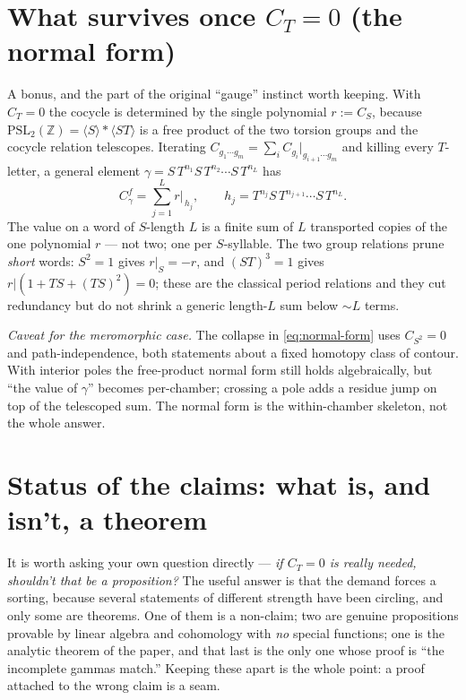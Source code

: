 \documentclass[11pt]{article}
\newcommand{\ZZ}{\mathbb{Z}}
\newcommand{\PSLZ}{\mathrm{PSL}_2(\ZZ)}
\begin{document}
\section{What survives once $C_T = 0$ (the normal form)}

A bonus, and the part of the original ``gauge'' instinct worth keeping.
With $C_T = 0$ the cocycle is determined by the single polynomial
$r := C_S$, because $\PSLZ = \langle S\rangle * \langle ST\rangle$ is a
free product of the two torsion groups and the cocycle relation
telescopes. Iterating $C_{g_1\cdots g_m} = \sum_i C_{g_i}\big|_{g_{i+1}
\cdots g_m}$ and killing every $T$-letter, a general element
$\gamma = S\,T^{n_1} S\,T^{n_2}\cdots S\,T^{n_L}$ has
\begin{equation}\label{eq:normal-form}
  C^f_\gamma = \sum_{j=1}^{L} r\big|_{\,h_j},
  \qquad h_j = T^{n_j} S\, T^{n_{j+1}} \cdots S\, T^{n_L}.
\end{equation}
The value on a word of $S$-length $L$ is a finite sum of $L$ transported
copies of the one polynomial $r$ --- not two; one per $S$-syllable. The
two group relations prune \emph{short} words: $S^2 = 1$ gives
$r|_S = -r$, and $(ST)^3 = 1$ gives $r|(1 + TS + (TS)^2) = 0$; these are
the classical period relations and they cut redundancy but do not shrink
a generic length-$L$ sum below $\sim L$ terms.

\medskip
\noindent\textit{Caveat for the meromorphic case.} The collapse in
\eqref{eq:normal-form} uses $C_{S^2}=0$ and path-independence, both
statements about a fixed homotopy class of contour. With interior poles
the free-product normal form still holds algebraically, but ``the value
of $\gamma$'' becomes per-chamber; crossing a pole adds a residue jump on
top of the telescoped sum. The normal form is the within-chamber
skeleton, not the whole answer.

\section{Status of the claims: what is, and isn't, a theorem}

It is worth asking your own question directly --- \emph{if $C_T = 0$ is
really needed, shouldn't that be a proposition?} The useful answer is that
the demand forces a sorting, because several statements of different
strength have been circling, and only some are theorems. One of them is a
non-claim; two are genuine propositions provable by linear algebra and
cohomology with \emph{no} special functions; one is the analytic theorem
of the paper, and that last is the only one whose proof is ``the
incomplete gammas match.'' Keeping these apart is the whole point: a
proof attached to the wrong claim is a seam.
\end{document}
